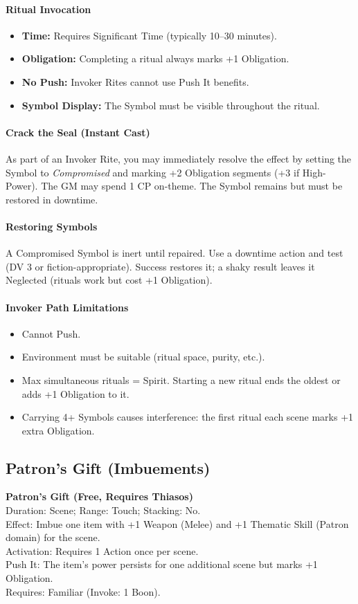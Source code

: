 \paragraph{Ritual Invocation}
\begin{itemize}
  \item \textbf{Time:} Requires Significant Time (typically 10–30 minutes). 
  \item \textbf{Obligation:} Completing a ritual always marks +1 Obligation. 
  \item \textbf{No Push:} Invoker Rites cannot use Push It benefits. 
  \item \textbf{Symbol Display:} The Symbol must be visible throughout the ritual.
\end{itemize}

\paragraph{Crack the Seal (Instant Cast)}
As part of an Invoker Rite, you may immediately resolve the effect by setting the Symbol to \emph{Compromised} and marking +2 Obligation segments (+3 if High-Power). The GM may spend 1 CP on-theme. The Symbol remains but must be restored in downtime.

\paragraph{Restoring Symbols}
A Compromised Symbol is inert until repaired. Use a downtime action and test (DV 3 or fiction-appropriate). Success restores it; a shaky result leaves it Neglected (rituals work but cost +1 Obligation).

\paragraph{Invoker Path Limitations}
\begin{itemize}
  \item Cannot Push. 
  \item Environment must be suitable (ritual space, purity, etc.).
  \item Max simultaneous rituals = Spirit. Starting a new ritual ends the oldest or adds +1 Obligation to it. 
  \item Carrying 4+ Symbols causes interference: the first ritual each scene marks +1 extra Obligation.
\end{itemize}

\subsection{Patron’s Gift (Imbuements)}
\textbf{Patron’s Gift (Free, Requires Thiasos)}\\
Duration: Scene; Range: Touch; Stacking: No.\\
Effect: Imbue one item with +1 Weapon (Melee) and +1 Thematic Skill (Patron domain) for the scene.\\
Activation: Requires 1 Action once per scene.\\
Push It: The item’s power persists for one additional scene but marks +1 Obligation.\\
Requires: Familiar (Invoke: 1 Boon).

